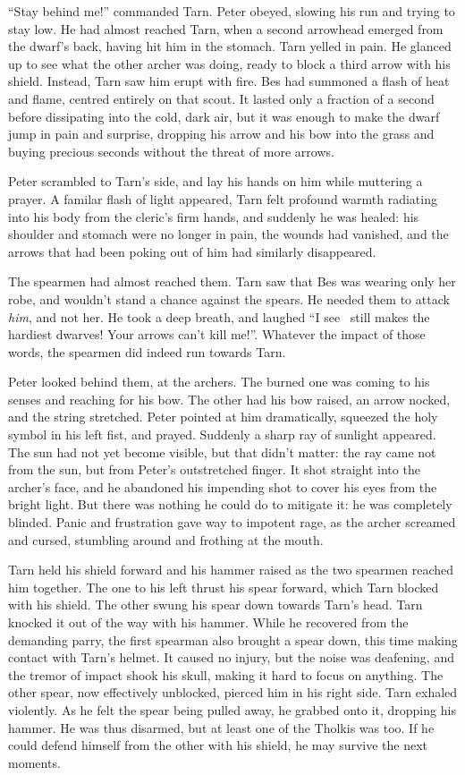 ``Stay behind me!'' commanded Tarn.  Peter obeyed, slowing his run and trying to stay low.  He had almost reached Tarn, when a second arrowhead emerged from the dwarf's back, having hit him in the stomach.  Tarn yelled in pain.  He glanced up to see what the other archer was doing, ready to block a third arrow with his shield.  Instead, Tarn saw him erupt with fire.  Bes had summoned a flash of heat and flame, centred entirely on that scout.  It lasted only a fraction of a second before dissipating into the cold, dark air, but it was enough to make the dwarf jump in pain and surprise, dropping his arrow and his bow into the grass and buying precious seconds without the threat of more arrows.

Peter scrambled to Tarn's side, and lay his hands on him while muttering a prayer.  A familar flash of light appeared, Tarn felt profound warmth radiating into his body from the cleric's firm hands, and suddenly he was healed: his shoulder and stomach were no longer in pain, the wounds had vanished, and the arrows that had been poking out of him had similarly disappeared.

The spearmen had almost reached them.  Tarn saw that Bes was wearing only her robe, and wouldn't stand a chance against the spears.  He needed them to attack \emph{him}, and not her.  He took a deep breath, and laughed ``I see \korbarthrond\ still makes the hardiest dwarves!  Your arrows can't kill me!''.  Whatever the impact of those words, the spearmen did indeed run towards Tarn.

Peter looked behind them, at the archers.  The burned one was coming to his senses and reaching for his bow.  The other had his bow raised, an arrow nocked, and the string stretched.  Peter pointed at him dramatically, squeezed the holy symbol in his left fist, and prayed.  Suddenly a sharp ray of sunlight appeared.  The sun had not yet become visible, but that didn't matter: the ray came not from the sun, but from Peter's outstretched finger.  It shot straight into the archer's face, and he abandoned his impending shot to cover his eyes from the bright light.  But there was nothing he could do to mitigate it: he was completely blinded.  Panic and frustration gave way to impotent rage, as the archer screamed and cursed, stumbling around and frothing at the mouth.

Tarn held his shield forward and his hammer raised as the two spearmen reached him together.  The one to his left thrust his spear forward, which Tarn blocked with his shield.  The other swung his spear down towards Tarn's head.  Tarn knocked it out of the way with his hammer.  While he recovered from the demanding parry, the first spearman also brought a spear down, this time making contact with Tarn's helmet.  It caused no injury, but the noise was deafening, and the tremor of impact shook his skull, making it hard to focus on anything.  The other spear, now effectively unblocked, pierced him in his right side.  Tarn exhaled violently.  As he felt the spear being pulled away, he grabbed onto it, dropping his hammer.  He was thus disarmed, but at least one of the Tholkis was too.  If he could defend himself from the other with his shield, he may survive the next moments.

